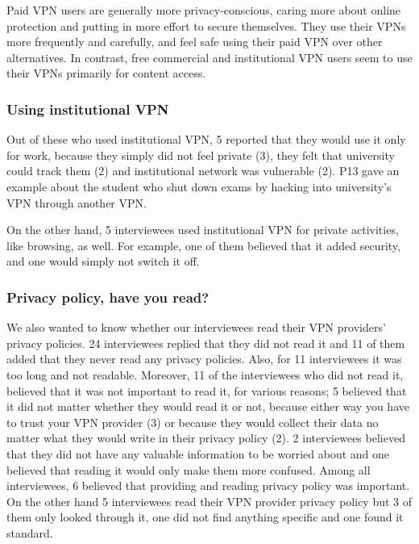 Paid VPN users are generally more privacy-conscious, caring more about online
protection and putting in more effort to secure themselves. They use their
VPNs more frequently and carefully, and feel safe using their paid VPN over
other alternatives. In contrast, free commercial and institutional VPN users
seem to use their VPNs primarily for content access.


\subsubsection{Using institutional VPN} Out of these who used institutional
VPN, 5 reported that they would use it only for work, because they simply did
not feel private (3), they felt that university could track them (2) and
institutional network was vulnerable  (2). P13 gave an example about the
student who shut down exams by hacking into university's VPN through another
VPN. %

On the other hand, 5 interviewees used institutional VPN for private
activities, like browsing, as well. For example, one of them believed that it
added security, and one would simply not switch it off. 

\subsubsection{Privacy policy, have you read?} We also wanted to know whether
our interviewees read their VPN providers’ privacy policies. 24 interviewees
replied that they did not read it and 11 of them added that they never read
any privacy policies. Also, for 11 interviewees it was too long and not
readable. Moreover, 11 of the interviewees who did not read it, believed that
it was not important to read it, for various reasons; 5 believed that it did
not matter whether they would read it or not, because either way you have to
trust your VPN provider (3) or because they would collect their data no matter
what they would write in their privacy policy (2). 2 interviewees believed
that they did not have any valuable information to be worried about and one
believed that reading it would only make them more confused. Among all
interviewees, 6 believed that providing and reading privacy policy was
important. On the other hand 5 interviewees read their VPN provider privacy
policy but 3 of them only looked through it, one did not find anything
specific and one found it standard. 

